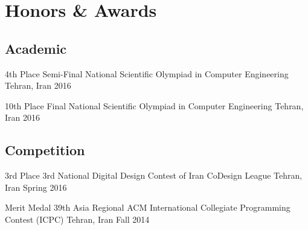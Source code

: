 \section{Honors \& Awards}

\subsection{Academic}

\cventry%
{4th Place}
{Semi-Final National Scientific Olympiad in Computer Engineering}
{Tehran, Iran}{}
{2016}{}

\cventry%
{10th Place}
{Final National Scientific Olympiad in Computer Engineering}
{Tehran, Iran}{}
{2016}{}

\subsection{Competition}

\cventry%
{3rd Place}
{3rd National Digital Design Contest of Iran CoDesign League}
{Tehran, Iran}{}
{Spring 2016}{}

\cventry%
{Merit Medal}
{39th Asia Regional ACM International Collegiate Programming Contest (ICPC)}
{Tehran, Iran}{}
{Fall 2014}{}

